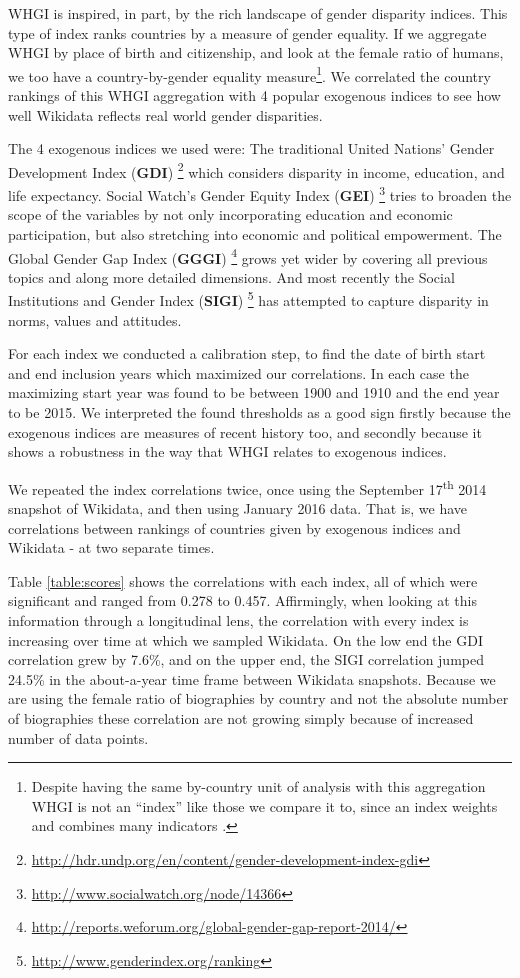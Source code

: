 \documentclass{sig-alternate-05-2015}
\begin{document}
WHGI is inspired, in part, by the rich landscape of gender disparity indices. This type of index ranks countries by a measure of gender equality. If we aggregate WHGI by place of birth and citizenship, and look at the female ratio of humans, we too have a country-by-gender equality measure\footnote{Despite having the same by-country unit of analysis with this aggregation WHGI is not an ``index'' like those we compare it to, since an index weights and combines many indicators \cite{rossi_handbook_1980}. }.  We correlated the country rankings of this WHGI aggregation with 4 popular exogenous indices to see how well Wikidata reflects real world gender disparities.

The 4 exogenous indices we used were: The traditional United Nations' Gender Development Index (\textbf{GDI})  \footnote{\url{http://hdr.undp.org/en/content/gender-development-index-gdi}} which considers disparity in income, education, and life expectancy. Social Watch's Gender Equity Index (\textbf{GEI}) \footnote{\url{http://www.socialwatch.org/node/14366}} tries to broaden the scope of the variables by not only incorporating education and economic participation, but also stretching into economic and political empowerment. The Global Gender Gap Index (\textbf{GGGI}) \footnote{\url{http://reports.weforum.org/global-gender-gap-report-2014/}} grows yet wider by covering all previous topics and along more detailed dimensions. And most recently  the Social Institutions and Gender Index (\textbf{SIGI}) \footnote{\url{http://www.genderindex.org/ranking}} has attempted to capture disparity in norms, values and attitudes.

For each index we conducted a calibration step, to find the date of birth start and end inclusion years which maximized our correlations. In each case the maximizing start year was found to be between 1900 and 1910 and the end year to be 2015. We interpreted the found thresholds as a good sign firstly because the exogenous indices are measures of recent history too, and secondly because it shows a robustness in the way that WHGI relates to exogenous indices.

We repeated the index correlations twice, once using the September 17\textsuperscript{th} 2014 snapshot of Wikidata, and then using January 2016 data. That is, we have correlations between rankings of countries given by exogenous indices and Wikidata - at two separate times.

Table \ref{table:scores} shows the correlations with each index, all of which were significant and ranged from 0.278 to 0.457. Affirmingly, when looking at this information through a longitudinal lens, the correlation with every index is increasing over time at which we sampled Wikidata. On the low end the GDI correlation grew by 7.6\%, and on the upper end, the SIGI correlation jumped 24.5\% in the about-a-year time frame between Wikidata snapshots. Because we are using the  female ratio of biographies by country and not the absolute number of biographies these correlation are not growing simply because of increased number of data points.
\end{document}
